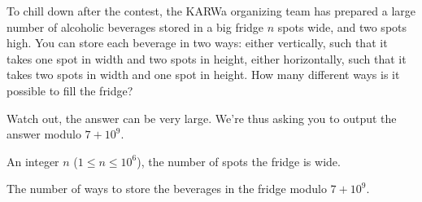 \problemname{\problemyamlname}



To chill down after the contest, the KARWa organizing team has prepared a large number of alcoholic beverages stored in a big fridge $n$ spots wide, and two spots high.
You can store each beverage in two ways: either vertically, such that it takes one spot in width and two spots in height, either horizontally, such that it takes two spots in width and one spot in height.
How many different ways is it possible to fill the fridge?

Watch out, the answer can be very large.
We're thus asking you to output the answer modulo $7+10^9$.

\begin{Input}
	An integer $n$ ($1 \le n \le 10^{6}$), the number of spots the fridge is wide.
\end{Input}

\begin{Output}
	The number of ways to store the beverages in the fridge modulo $7+10^9$.
\end{Output}
